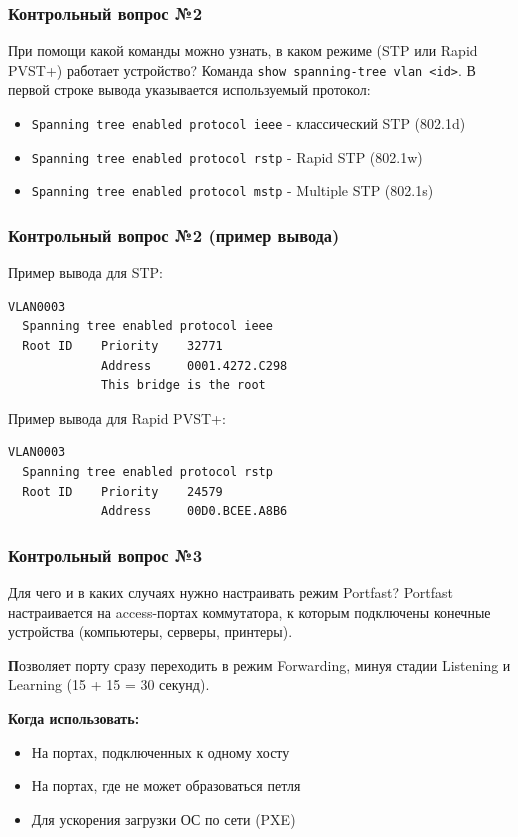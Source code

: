 \begin{frame}[containsverbatim]
\frametitle{Контрольный вопрос №2}
\begin{block}{При помощи какой команды можно узнать, в каком режиме (STP или Rapid PVST+) работает устройство?}
Команда \texttt{show spanning-tree vlan <id>}. В первой строке вывода указывается используемый протокол:
\begin{itemize}
\item \texttt{Spanning tree enabled protocol ieee} - классический STP (802.1d)
\item \texttt{Spanning tree enabled protocol rstp} - Rapid STP (802.1w)
\item \texttt{Spanning tree enabled protocol mstp} - Multiple STP (802.1s)
\end{itemize}
\end{block}
\end{frame}

\begin{frame}[containsverbatim]
\frametitle{Контрольный вопрос №2 (пример вывода)}
\begin{block}{Пример вывода для STP:}
\begin{verbatim}
VLAN0003
  Spanning tree enabled protocol ieee
  Root ID    Priority    32771
             Address     0001.4272.C298
             This bridge is the root
\end{verbatim}
\end{block}
\begin{block}{Пример вывода для Rapid PVST+:}
\begin{verbatim}
VLAN0003
  Spanning tree enabled protocol rstp
  Root ID    Priority    24579
             Address     00D0.BCEE.A8B6
\end{verbatim}
\end{block}
\end{frame}

\begin{frame}
\frametitle{Контрольный вопрос №3}
\begin{block}{Для чего и в каких случаях нужно настраивать режим Portfast?}
Portfast настраивается на access-портах коммутатора, к которым подключены конечные устройства (компьютеры, серверы, принтеры).

\textbf Позволяет порту сразу переходить в режим Forwarding, минуя стадии Listening и Learning (15 + 15 = 30 секунд).

\textbf{Когда использовать:}
\begin{itemize}
\item На портах, подключенных к одному хосту
\item На портах, где не может образоваться петля
\item Для ускорения загрузки ОС по сети (PXE)
\end{itemize}

\end{block}
\end{frame}

